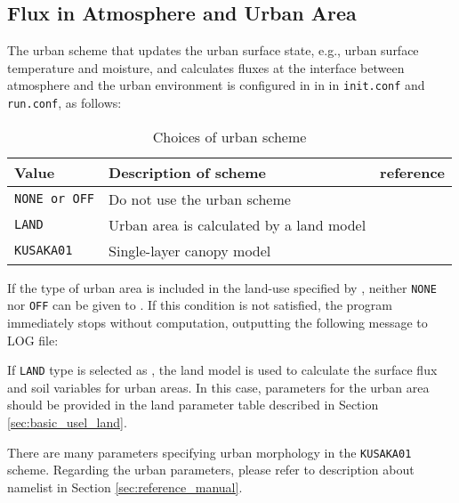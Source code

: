 \subsection{Flux in Atmosphere and Urban Area}

The urban scheme that updates the urban surface state, e.g., urban surface temperature and moisture, and calculates fluxes at the interface between atmosphere and the urban environment is configured in  in  in \verb|init.conf| and \verb|run.conf|, as follows:
%

\begin{table}[hbt]
\begin{center}
  \caption{Choices of urban scheme}
  \label{tab:nml_urban}
  \begin{tabularx}{150mm}{llX} \hline
    \rowcolor[gray]{0.9}  Value  & Description of scheme & reference \\ \hline
      \verb|NONE or OFF|         & Do not use the urban scheme            \\
      \verb|LAND|                & Urban area is calculated by a land model \\
      \verb|KUSAKA01|            & Single-layer canopy model  & \citet{kusaka_2001} \\
    \hline
  \end{tabularx}
\end{center}
\end{table}

If the type of urban area is included in the land-use specified by , neither \verb|NONE| nor \verb|OFF| can be given to .
If this condition is not satisfied, the program immediately stops without computation, outputting the following message to LOG file:
%

If \verb|LAND| type is selected as , the land model is used to calculate the surface flux and soil variables for urban areas.
In this case, parameters for the urban area should be provided in the land parameter table described in Section \ref{sec:basic_usel_land}.

There are many parameters specifying urban morphology in the \verb|KUSAKA01| scheme.
Regarding the urban parameters, please refer to description about namelist in Section \ref{sec:reference_manual}.

